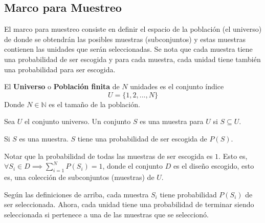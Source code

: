 %
%

\subsection{Marco para Muestreo}

El marco para muestreo \cite{lohr-2009} consiste en definir el espacio de la población (el universo) de donde se obtendrán las posibles muestras (subconjuntos) y estas muestras contienen las unidades que serán seleccionadas. Se nota que cada muestra tiene una probabilidad de ser escogida y para cada muestra, cada unidad tiene también una probabilidad para ser escogida.

\begin{definition}[Universo]
    El \textbf{Universo} o \textbf{Población finita} de $N$ unidades es el conjunto índice
    $$
    U = \{ 1, 2, ..., N \}
    $$
    Donde $N \in \mathbb{N}$ es el tamaño de la población.
\end{definition}

\bigbreak

\begin{definition}[Muestra]
    Sea $U$ el conjunto universo. Un conjunto $S$ es una muestra para $U$ si $S \subseteq U$.
\end{definition}

\bigbreak

\begin{definition}
    Si $S$ es una muestra. $S$ tiene una probabilidad de ser escogida de $P(S)$.
\end{definition}

\bigbreak

Notar que la probabilidad de todas las muestras de ser escogida es $1$. Esto es, $\forall S_i \in D \implies \sum \limits_{i=1}^{N} P(S_i) = 1$, donde el conjunto $D$ es el diseño escogido, esto es, una colección de subconjuntos (muestras) de $U$.

\bigbreak

Según las definiciones de arriba, cada muestra $S_i$ tiene probabilidad $P(S_i)$ de ser seleccionada. Ahora, cada unidad tiene una probabilidad de terminar siendo seleccionada si pertenece a una de las muestras que se seleccionó.

